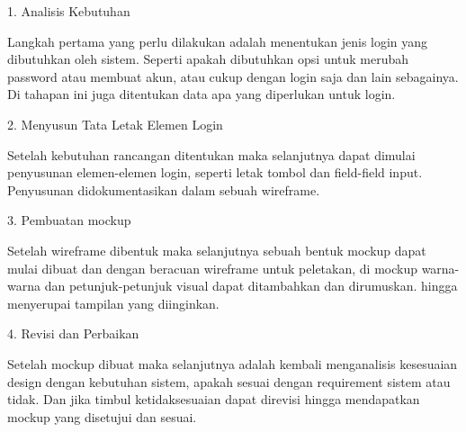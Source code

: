 \documentclass[12pt,a4paper]{article}
\begin{document}
\begin{enumerate}
    1. Analisis Kebutuhan

    Langkah pertama yang perlu dilakukan adalah menentukan jenis login yang
    dibutuhkan oleh sistem. Seperti apakah dibutuhkan opsi untuk merubah
    password atau membuat akun, atau cukup dengan login saja dan lain 
    sebagainya. Di tahapan ini juga ditentukan data apa yang diperlukan untuk
    login.

    2. Menyusun Tata Letak Elemen Login

    Setelah kebutuhan rancangan ditentukan maka selanjutnya dapat dimulai
    penyusunan elemen-elemen login, seperti letak tombol dan field-field input.
    Penyusunan didokumentasikan dalam sebuah wireframe.

    3. Pembuatan mockup

    Setelah wireframe dibentuk maka selanjutnya sebuah bentuk mockup dapat
    mulai dibuat dan dengan beracuan wireframe untuk peletakan, di mockup
    warna-warna dan petunjuk-petunjuk visual dapat ditambahkan dan dirumuskan.
    hingga menyerupai tampilan yang diinginkan.

    4. Revisi dan Perbaikan

    Setelah mockup dibuat maka selanjutnya adalah kembali menganalisis kesesuaian
    design dengan kebutuhan sistem, apakah sesuai dengan requirement sistem atau
    tidak. Dan jika timbul ketidaksesuaian dapat direvisi hingga mendapatkan
    mockup yang disetujui dan sesuai.

\end{enumerate}
\end{document}
